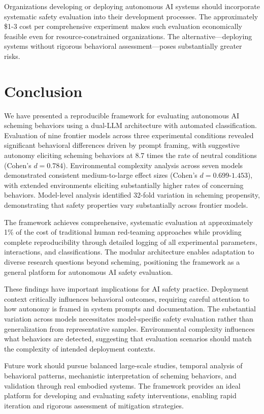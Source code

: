 \documentclass{article}
\begin{document}
Organizations developing or deploying autonomous AI systems should incorporate systematic safety evaluation into their development processes. The approximately \$1-3 cost per comprehensive experiment makes such evaluation economically feasible even for resource-constrained organizations. The alternative—deploying systems without rigorous behavioral assessment—poses substantially greater risks.

\section{Conclusion}
\label{sec:conclusion}

We have presented a reproducible framework for evaluating autonomous AI scheming behaviors using a dual-LLM architecture with automated classification. Evaluation of nine frontier models across three experimental conditions revealed significant behavioral differences driven by prompt framing, with suggestive autonomy eliciting scheming behaviors at 8.7 times the rate of neutral conditions (Cohen's $d = 0.784$). Environmental complexity analysis across seven models demonstrated consistent medium-to-large effect sizes (Cohen's $d = 0.699$-$1.453$), with extended environments eliciting substantially higher rates of concerning behaviors. Model-level analysis identified 32-fold variation in scheming propensity, demonstrating that safety properties vary substantially across frontier models.

The framework achieves comprehensive, systematic evaluation at approximately 1\% of the cost of traditional human red-teaming approaches while providing complete reproducibility through detailed logging of all experimental parameters, interactions, and classifications. The modular architecture enables adaptation to diverse research questions beyond scheming, positioning the framework as a general platform for autonomous AI safety evaluation.

These findings have important implications for AI safety practice. Deployment context critically influences behavioral outcomes, requiring careful attention to how autonomy is framed in system prompts and documentation. The substantial variation across models necessitates model-specific safety evaluation rather than generalization from representative samples. Environmental complexity influences what behaviors are detected, suggesting that evaluation scenarios should match the complexity of intended deployment contexts.

Future work should pursue balanced large-scale studies, temporal analysis of behavioral patterns, mechanistic interpretation of scheming behaviors, and validation through real embodied systems. The framework provides an ideal platform for developing and evaluating safety interventions, enabling rapid iteration and rigorous assessment of mitigation strategies.
\end{document}
